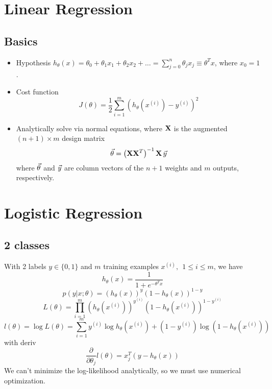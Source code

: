 \documentclass[11pt]{article}
\begin{document}
\newpage
\section{Linear Regression}
\label{sec:linreg}
\subsection{Basics}
\begin{itemize}
  \item Hypothesis
  $h_\theta(x) = \theta_0 + \theta_1 x_1 + \theta_2 x_2 + \dots = \sum_{j=0}^{n}
  \theta_j x_j \equiv \theta^T x$, where $x_0 = 1$.
  \item Cost function
  \begin{equation}
    J(\theta) = \frac{1}{2} \sum_{i=1}^m \left(h_\theta(x^{(i)}) - y^{(i)}\right)^2
  \end{equation}
  \item Analytically solve via normal equations, where $\mathbf{X}$ is the augmented
  $(n+1) \times m$ design matrix
  \begin{equation}
    \vec{\theta} = \left(\mathbf{X} \mathbf{X}^T \right)^{-1} \mathbf{X}\, \vec{y}
  \end{equation}
  where $\vec{\theta}$ and $\vec{y}$ are column vectors of the $n+1$ weights and $m$
  outputs, respectively.
\end{itemize}



\section{Logistic Regression}
\label{sec:logreg}
\subsection{2 classes}
With 2 labels $y \in \{0,1\}$ and $m$ training examples $x^{(i)},\ \ 1 \leq i \leq m$,
we have
\begin{equation}
  h_\theta (x) = \frac{1}{1 + e^{-\theta^T x}}
\end{equation}
\begin{equation}
  p(y|x;\theta) = (h_\theta (x))^y (1 - h_\theta (x))^{1-y}
\end{equation}
\begin{equation}
  L(\theta) = \prod_{i=1}^m (h_\theta (x^{(i)}))^{y^{(i)}} (1 - h_\theta
  (x^{(i)}))^{1-y^{(i)}}
\end{equation}
\begin{equation}
  l(\theta) = \log L(\theta) = \sum_{i=1}^m y^{(i)} \log h_\theta (x^{(i)}) + (1 -
  y^{(i)}) \log(1 - h_\theta  (x^{(i)}))
\end{equation}
with deriv
\begin{equation}
  \frac{\partial}{\partial \theta_j} l(\theta) = x_j^T (y - h_\theta (x))
\end{equation}
We can't minimize the log-likelihood analytically, so we must use numerical
optimization.
\end{document}
